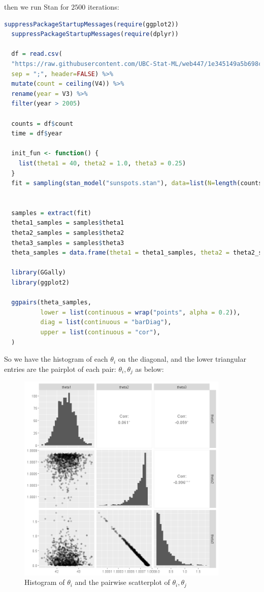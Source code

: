 \documentclass{article}
\begin{document}
then we run Stan for $2500$ iterations:
\begin{lstlisting}[language=R]
  suppressPackageStartupMessages(require(ggplot2))
  suppressPackageStartupMessages(require(dplyr))

  df = read.csv(
  "https://raw.githubusercontent.com/UBC-Stat-ML/web447/1e345149a5b698ccdf0a7e9b0aeabec2463c50ca/data/sunspots-SN_m_tot_V2.0.csv",
  sep = ";", header=FALSE) %>%
  mutate(count = ceiling(V4)) %>%
  rename(year = V3) %>%
  filter(year > 2005)

  counts = df$count 
  time = df$year

  init_fun <- function() {
    list(theta1 = 40, theta2 = 1.0, theta3 = 0.25)
  }
  fit = sampling(stan_model("sunspots.stan"), data=list(N=length(counts), y=counts, t=time), chains=1, iter=2500, init = init_fun, control = list(max_treedepth = 15))


  samples = extract(fit)
  theta1_samples = samples$theta1
  theta2_samples = samples$theta2
  theta3_samples = samples$theta3
  theta_samples = data.frame(theta1 = theta1_samples, theta2 = theta2_samples, theta3 = theta3_samples)

  library(GGally)
  library(ggplot2)

  ggpairs(theta_samples, 
          lower = list(continuous = wrap("points", alpha = 0.2)),
          diag = list(continuous = "barDiag"),
          upper = list(continuous = "cor"),
  )
\end{lstlisting}
So we have the histogram of each $\theta_i$ on the diagonal, and the lower triangular entries are the pairplot of each pair: $\theta_i, \theta_j$ as below:
\begin{figure}[H]
  \centering
  \includegraphics[width=0.9\textwidth, height=0.55\textheight]{pairplot.png}
  \caption{Histogram of $\theta_i$ and the pairwise scatterplot of $\theta_i, \theta_j$}
  \label{fig:pairplot}
\end{figure}
\end{document}
